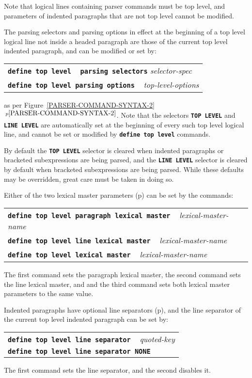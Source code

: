 \documentclass[12pt]{article}
\makeatletter
\newcommand{\TT}[1]{{\tt \bfseries #1}}
\newcommand{\ttmkey}[2]{\TT{#1}\index{#1@\TT{#1}!#2}}
\newcommand{\itemref}[1]{\ref{#1}$\,^{p\pageref{#1}}$}
\newcommand{\pagref}[1]{p\pageref{#1}}
\makeatother
\begin{document}
Note that logical lines containing parser commands must be top level,
and parameters of indented paragraphs that are not top level cannot
be modified.

The parsing selectors and parsing options
in effect at the beginning of a top level logical line not inside
a headed paragraph are those of the
current top level indented paragraph, and can be modified or set by:
\begin{center}
    \begin{tabular}[t]{l}
    \ttmkey{define top level}{parser command} ~
    \TT{parsing selectors} {\em selector-spec} \\
    \TT{define top level parsing options} ~ {\em top-level-options} \\
    \end{tabular}
\end{center}
as per Figure~\itemref{PARSER-COMMAND-SYNTAX-2}.
Note that the selectors \TT{TOP LEVEL}\label{TOP-LEVEL-SELECTOR}
and \TT{LINE LEVEL} are automatically set at the beginning of
every such top level logical line, and cannot be set or modified
by \TT{define top level} commands.

By default the \TT{TOP LEVEL} selector is cleared
when indented paragraphs or bracketed subexpressions are being parsed,
and the \TT{LINE LEVEL} selector is cleared by default when
bracketed subexpressions are being parsed.  While these defaults
may be overridden, great care must be taken in doing so.

Either of the two lexical master parameters (\pagref{LEXICAL-MASTER-PARAMETERS})
can be set by the commands:
\begin{center}
    \begin{tabular}[t]{l}
    \TT{define top level paragraph lexical master} ~
        {\em lexical-master-name} \\
    \TT{define top level line lexical master} ~
        {\em lexical-master-name} \\
    \TT{define top level lexical master} ~
        {\em lexical-master-name} \\
    \end{tabular}
\end{center}
The first command sets the paragraph lexical master,
the second command sets the line lexical master, and
and the third command
sets both lexical master parameters to the same value.

Indented paragraphs have optional line separators (\pagref{LINE-SEPARATOR}),
and the line separator of the current top level indented paragraph can be
set by:
\begin{center}
    \begin{tabular}[t]{l}
    \ttmkey{define top level line separator}{parser command} ~
           {\em quoted-key} \\
    \TT{define top level line separator NONE} \\
    \end{tabular}
\end{center}
The first command sets the line separator, and the second disables
it.
\end{document}
